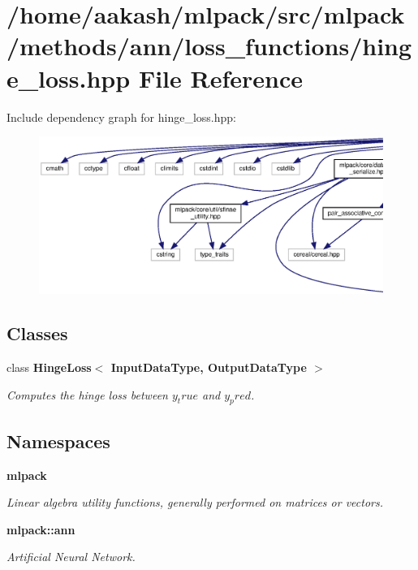 \section{/home/aakash/mlpack/src/mlpack/methods/ann/loss\+\_\+functions/hinge\+\_\+loss.hpp File Reference}
\label{hinge__loss_8hpp}
Include dependency graph for hinge\+\_\+loss.\+hpp\+:
\nopagebreak
\begin{figure}[H]
\begin{center}
\leavevmode
\includegraphics[width=350pt]{hinge__loss_8hpp__incl}
\end{center}
\end{figure}
\subsection*{Classes}
\begin{DoxyCompactItemize}
\item 
class \textbf{ Hinge\+Loss$<$ Input\+Data\+Type, Output\+Data\+Type $>$}
\begin{DoxyCompactList}\small\item\em Computes the hinge loss between $y_true$ and $y_pred$. \end{DoxyCompactList}\end{DoxyCompactItemize}
\subsection*{Namespaces}
\begin{DoxyCompactItemize}
\item 
 \textbf{ mlpack}
\begin{DoxyCompactList}\small\item\em Linear algebra utility functions, generally performed on matrices or vectors. \end{DoxyCompactList}\item 
 \textbf{ mlpack\+::ann}
\begin{DoxyCompactList}\small\item\em Artificial Neural Network. \end{DoxyCompactList}\end{DoxyCompactItemize}


